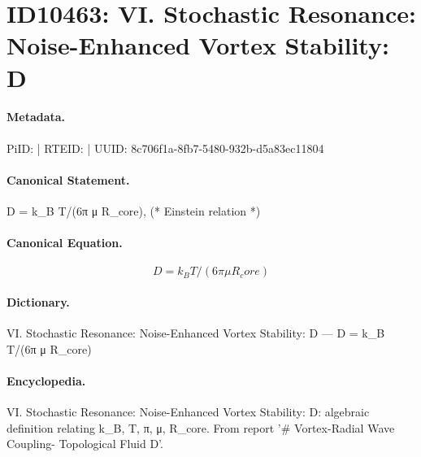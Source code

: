\section*{ID10463: VI. Stochastic Resonance: Noise-Enhanced Vortex Stability: D}
\paragraph{Metadata.}
PiID:  | RTEID:  | UUID: 8c706f1a-8fb7-5480-932b-d5a83ec11804

\paragraph{Canonical Statement.}
D = k\_B T/(6π μ R\_core), (* Einstein relation *)

\paragraph{Canonical Equation.}
\[
D = k_B T/(6π μ R_core)
\]

\paragraph{Dictionary.}
VI. Stochastic Resonance: Noise-Enhanced Vortex Stability: D — D = k\_B T/(6π μ R\_core)

\paragraph{Encyclopedia.}
VI. Stochastic Resonance: Noise-Enhanced Vortex Stability: D: algebraic definition relating k\_B, T, π, μ, R\_core. From report '\# Vortex-Radial Wave Coupling- Topological Fluid D'.
